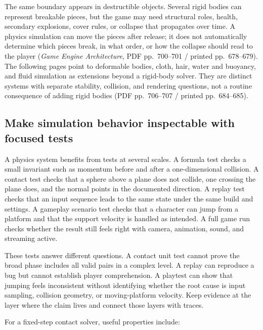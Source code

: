 The same boundary appears in destructible objects. Several rigid bodies can represent breakable pieces, but the game may need structural roles, health, secondary explosions, cover rules, or collapse that propagates over time. A physics simulation can move the pieces after release; it does not automatically determine which pieces break, in what order, or how the collapse should read to the player (\emph{Game Engine Architecture}, PDF pp.~700--701 / printed pp.~678--679). The following pages point to deformable bodies, cloth, hair, water and buoyancy, and fluid simulation as extensions beyond a rigid-body solver. They are distinct systems with separate stability, collision, and rendering questions, not a routine consequence of adding rigid bodies (PDF pp.~706--707 / printed pp.~684--685).

\subsection{Make simulation behavior inspectable with focused tests}\label{06-engine-ii-ch033-make-simulation-behavior-inspectable-with-focused-tests}

A physics system benefits from tests at several scales. A formula test checks a small invariant such as momentum before and after a one-dimensional collision. A contact test checks that a sphere above a plane does not collide, one crossing the plane does, and the normal points in the documented direction. A replay test checks that an input sequence leads to the same state under the same build and settings. A gameplay scenario test checks that a character can jump from a platform and that the support velocity is handled as intended. A full game run checks whether the result still feels right with camera, animation, sound, and streaming active.

These tests answer different questions. A contact unit test cannot prove the broad phase includes all valid pairs in a complex level. A replay can reproduce a bug but cannot establish player comprehension. A playtest can show that jumping feels inconsistent without identifying whether the root cause is input sampling, collision geometry, or moving-platform velocity. Keep evidence at the layer where the claim lives and connect those layers with traces.

For a fixed-step contact solver, useful properties include:

